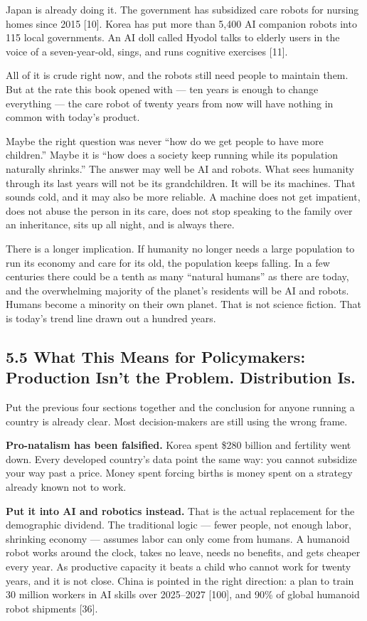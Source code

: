 \documentclass[11pt,a4paper]{article}
\begin{document}
Japan is already doing it. The government has subsidized care robots for nursing homes since 2015 [10]. Korea has put more than 5,400 AI companion robots into 115 local governments. An AI doll called Hyodol talks to elderly users in the voice of a seven-year-old, sings, and runs cognitive exercises [11].

All of it is crude right now, and the robots still need people to maintain them. But at the rate this book opened with --- ten years is enough to change everything --- the care robot of twenty years from now will have nothing in common with today's product.

Maybe the right question was never ``how do we get people to have more children.'' Maybe it is ``how does a society keep running while its population naturally shrinks.'' The answer may well be AI and robots. What sees humanity through its last years will not be its grandchildren. It will be its machines. That sounds cold, and it may also be more reliable. A machine does not get impatient, does not abuse the person in its care, does not stop speaking to the family over an inheritance, sits up all night, and is always there.

There is a longer implication. If humanity no longer needs a large population to run its economy and care for its old, the population keeps falling. In a few centuries there could be a tenth as many ``natural humans'' as there are today, and the overwhelming majority of the planet's residents will be AI and robots. Humans become a minority on their own planet. That is not science fiction. That is today's trend line drawn out a hundred years.

\subsection{5.5 What This Means for Policymakers: Production Isn't the Problem. Distribution Is.}

Put the previous four sections together and the conclusion for anyone running a country is already clear. Most decision-makers are still using the wrong frame.

\textbf{Pro-natalism has been falsified.} Korea spent \$280 billion and fertility went down. Every developed country's data point the same way: you cannot subsidize your way past a price. Money spent forcing births is money spent on a strategy already known not to work.

\textbf{Put it into AI and robotics instead.} That is the actual replacement for the demographic dividend. The traditional logic --- fewer people, not enough labor, shrinking economy --- assumes labor can only come from humans. A humanoid robot works around the clock, takes no leave, needs no benefits, and gets cheaper every year. As productive capacity it beats a child who cannot work for twenty years, and it is not close. China is pointed in the right direction: a plan to train 30 million workers in AI skills over 2025--2027 [100], and 90\% of global humanoid robot shipments [36].
\end{document}
